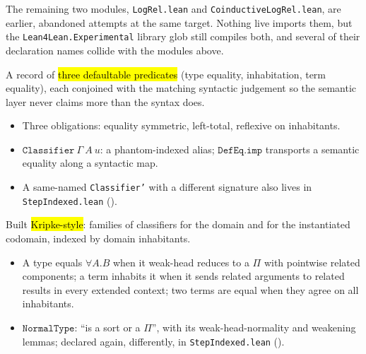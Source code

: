 The remaining two modules, \texttt{LogRel.lean} and \texttt{CoinductiveLogRel.lean}, are earlier,
abandoned attempts at the same target. Nothing live imports them, but the
\texttt{Lean4Lean.Experimental} library glob still compiles both, and several of their declaration
names collide with the modules above.

\begin{definition}
\label{structure:expa-logrel-classifier}
\leanok
{}

 A record of \hl{three defaultable predicates} (type equality, inhabitation, term
equality), each conjoined with the matching syntactic judgement so the semantic layer never claims
more than the syntax does.
\begin{itemize}
\item Three obligations: equality symmetric, left-total, reflexive on inhabitants.
\item $\mathtt{Classifier}\ \Gamma\ A\ u$: a phantom-indexed alias; $\mathtt{DefEq.imp}$ transports a
semantic equality along a syntactic map.
\item A same-named \texttt{Classifier'} with a different signature also lives in
\texttt{StepIndexed.lean} ().
\end{itemize}
\end{definition}

\begin{definition}
\label{def:expa-logrel-classifier-forallE}
\leanok
{}
 Built \hl{Kripke-style}: families of classifiers for the domain and for the
instantiated codomain, indexed by domain inhabitants.
\begin{itemize}
\item A type equals $\forall A.B$ when it weak-head reduces to a $\Pi$ with pointwise related
components; a term inhabits it when it sends related arguments to related results in every extended
context; two terms are equal when they agree on all inhabitants.
\item $\mathtt{NormalType}$: ``is a sort or a $\Pi$'', with its weak-head-normality and weakening
lemmas; declared again, differently, in \texttt{StepIndexed.lean}
().
\end{itemize}
\end{definition}

